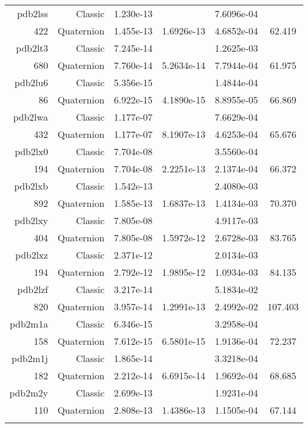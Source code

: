 \begin{xltabular}{\textwidth}{r|rS[table-format=1.3e+2]S[table-format=1.4e+2]S[table-format=1.4e+2]S[table-format=-1.3]}
pdb2lss & Classic & 1.230e-13 &  & 7.6096e-04 & \\
422 & Quaternion & 1.455e-13 & 1.6926e-13 & 4.6852e-04 & 62.419\\  \addlinespace
pdb2lt3 & Classic & 7.245e-14 &  & 1.2625e-03 & \\
680 & Quaternion & 7.760e-14 & 5.2634e-14 & 7.7944e-04 & 61.975\\  \addlinespace
pdb2lu6 & Classic & 5.356e-15 &  & 1.4844e-04 & \\
86 & Quaternion & 6.922e-15 & 4.1890e-15 & 8.8955e-05 & 66.869\\  \addlinespace
pdb2lwa & Classic & 1.177e-07 &  & 7.6629e-04 & \\
432 & Quaternion & 1.177e-07 & 8.1907e-13 & 4.6253e-04 & 65.676\\  \addlinespace
pdb2lx0 & Classic & 7.704e-08 &  & 3.5560e-04 & \\
194 & Quaternion & 7.704e-08 & 2.2251e-13 & 2.1374e-04 & 66.372\\  \addlinespace
pdb2lxb & Classic & 1.542e-13 &  & 2.4080e-03 & \\
892 & Quaternion & 1.585e-13 & 1.6837e-13 & 1.4134e-03 & 70.370\\  \addlinespace
pdb2lxy & Classic & 7.805e-08 &  & 4.9117e-03 & \\
404 & Quaternion & 7.805e-08 & 1.5972e-12 & 2.6728e-03 & 83.765\\  \addlinespace
pdb2lxz & Classic & 2.371e-12 &  & 2.0134e-03 & \\
194 & Quaternion & 2.792e-12 & 1.9895e-12 & 1.0934e-03 & 84.135\\  \addlinespace
pdb2lzf & Classic & 3.217e-14 &  & 5.1834e-02 & \\
820 & Quaternion & 3.957e-14 & 1.2991e-13 & 2.4992e-02 & 107.403\\  \addlinespace
pdb2m1a & Classic & 6.346e-15 &  & 3.2958e-04 & \\
158 & Quaternion & 7.612e-15 & 6.5801e-15 & 1.9136e-04 & 72.237\\  \addlinespace
pdb2m1j & Classic & 1.865e-14 &  & 3.3218e-04 & \\
182 & Quaternion & 2.212e-14 & 6.6915e-14 & 1.9692e-04 & 68.685\\  \addlinespace
pdb2m2y & Classic & 2.699e-13 &  & 1.9231e-04 & \\
110 & Quaternion & 2.808e-13 & 1.4386e-13 & 1.1505e-04 & 67.144\\  \addlinespace

\end{xltabular}
